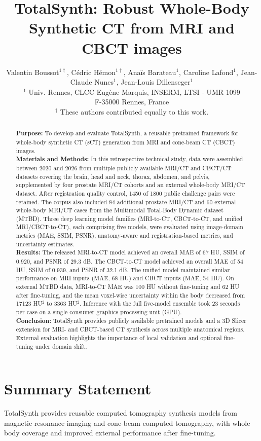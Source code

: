 \documentclass{article}
\title{TotalSynth: Robust Whole-Body Synthetic CT from MRI and CBCT images}
\author{
    Valentin Boussot$^{1\dagger}$, C{\'e}dric H{\'e}mon$^{1\dagger}$, Anaïs Barateau$^{1}$, Caroline Lafond$^{1}$, Jean-Claude Nunes$^{1}$, Jean-Louis Dillenseger$^{1}$\\
    $^1$ Univ. Rennes, CLCC Eug\`ene Marquis, INSERM, LTSI - UMR 1099\\
    F-35000 Rennes, France\\
    $^\dagger$ These authors contributed equally to this work.\\
}
\date{}
\begin{document}
\maketitle
\begin{abstract}
\sloppy
\textbf{Purpose:} To develop and evaluate TotalSynth, a reusable pretrained framework for whole-body synthetic CT (sCT) generation from MRI and cone-beam CT (CBCT) images. \\
\textbf{Materials and Methods:} In this retrospective technical study, data were assembled between 2020 and 2026 from multiple publicly available MRI/CT and CBCT/CT datasets covering the brain, head and neck, thorax, abdomen, and pelvis, supplemented by four prostate MRI/CT cohorts and an external whole-body MRI/CT dataset. After registration quality control, 1450 of 1800 public challenge pairs were retained. The corpus also included 84 additional prostate MRI/CT and 60 external whole-body MRI/CT cases from the Multimodal Total-Body Dynamic dataset (MTBD). Three deep learning model families (MRI-to-CT, CBCT-to-CT, and unified MRI/CBCT-to-CT), each comprising five models, were evaluated using image-domain metrics (MAE, SSIM, PSNR), anatomy-aware and registration-based metrics, and uncertainty estimates.\\
\textbf{Results:} The released MRI-to-CT model achieved an overall MAE of 67 HU, SSIM of 0.920, and PSNR of 29.3 dB. The CBCT-to-CT model achieved an overall MAE of 54 HU, SSIM of 0.939, and PSNR of 32.1 dB. The unified model maintained similar performance on MRI inputs (MAE, 68 HU) and CBCT inputs (MAE, 54 HU). On external MTBD data, MRI-to-CT MAE was 100 HU without fine-tuning and 62 HU after fine-tuning, and the mean voxel-wise uncertainty within the body decreased from 17123 HU$^2$ to 3363 HU$^2$. Inference with the full five-model ensemble took 23 seconds per case on a single consumer graphics processing unit (GPU).\\
\textbf{Conclusion:} TotalSynth provides publicly available pretrained models and a 3D Slicer extension for MRI- and CBCT-based CT synthesis across multiple anatomical regions. External evaluation highlights the importance of local validation and optional fine-tuning under domain shift.
\end{abstract}

\section*{Summary Statement}
TotalSynth provides reusable computed tomography synthesis models from magnetic resonance imaging and cone-beam computed tomography, with whole body coverage and improved external performance after fine-tuning.
\end{document}
